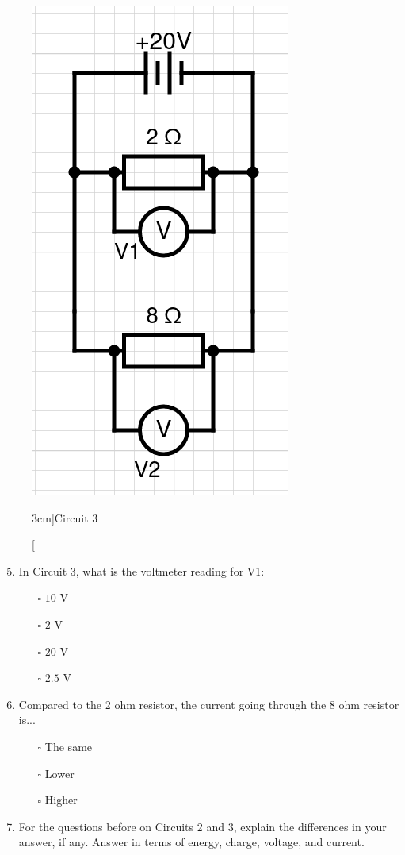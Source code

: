 \documentclass[a4paper,openany,nobib]{tufte-book}
\newcommand{\Qline}[1]{\noindent\rule{#1}{0.6pt}}
\newcounter{ql}
\newcommand{\Qlines}[1]{\forloop{ql}{0}{\value{ql}<#1}{\vskip0em\Qline{\linewidth}}}
\begin{document}
\begin{figure}[h!]
	\center
	\includegraphics[width=0.5\linewidth]{circ3}
	\caption[][3cm]{Circuit 3}
\end{figure}
\begin{enumerate}
	\setcounter{enumi}{4}
	\item In Circuit 3, what is the voltmeter reading for V1:
		\begin{itemize}
			\item[$\square$]$10$ V
			\item[$\square$]$2$ V
			\item[$\square$]$20$ V
			\item[$\square$]$2.5$ V
		\end{itemize}
		\newpage
	\item Compared to the 2 ohm resistor, the current going through the 8 ohm resistor is...
	\begin{itemize}
		\item[$\square$] The same
		\item[$\square$] Lower
		\item[$\square$] Higher
	\end{itemize}
\item For the questions before on Circuits 2 and 3, explain the differences in your answer, if any. Answer in terms of energy, charge, voltage, and current.
		\Qlines{2}
\end{enumerate}
\end{document}
